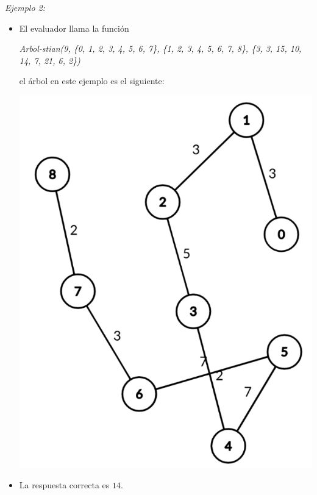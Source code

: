 \documentclass[12pt]{scrartcl}
\begin{document}
        {\itshape Ejemplo 2:}
        \begin{itemize}
            \item El evaluador llama la función 
            \begin{center}
                \textit{Arbol-stian(9, \{0, 1, 2, 3, 4, 5, 6, 7\}, \{1, 2, 3, 4, 5, 6, 7, 8\}, \{3, 3, 15, 10, 14, 7, 21, 6, 2\})}
            \end{center}
            el árbol en este ejemplo es el siguiente:
            \begin{center}
                \includegraphics[scale=0.25]{ej2.png}
            \end{center}
            \item La respuesta correcta es $14$.
        \end{itemize}
        
\end{document}
